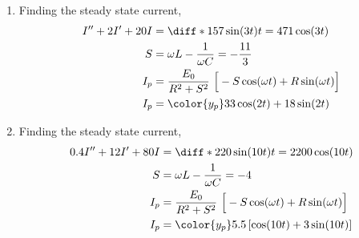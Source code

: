\begin{enumerate}
    \item Finding the steady state current,
          \begin{align}
              I'' + 2I' + 20I & = \diff* {157\sin(3t)}{t} = 471\cos(3t)                                     \\
              S               & = \omega L - \frac{1}{\omega C} = -\frac{11}{3}                             \\
              I_{p}           & = \frac{E_{0}}{R^{2} + S^{2}}\ \Big[-S\cos(\omega t) + R\sin(\omega t)\Big] \\
              I_{p}           & = {\color{y_p} 33\cos(2t) + 18\sin(2t)}                                     \\
          \end{align}

    \item Finding the steady state current,
          \begin{align}
              0.4I'' + 12I' + 80I & = \diff* {220\sin(10t)}{t} = 2200\cos(10t)                                  \\
              S                   & = \omega L - \frac{1}{\omega C} = -4                                        \\
              I_{p}               & = \frac{E_{0}}{R^{2} + S^{2}}\ \Big[-S\cos(\omega t) + R\sin(\omega t)\Big] \\
              I_{p}               & = {\color{y_p} 5.5 \left[ \cos(10t) + 3\sin(10t) \right]}                   \\
          \end{align}


\end{enumerate}
